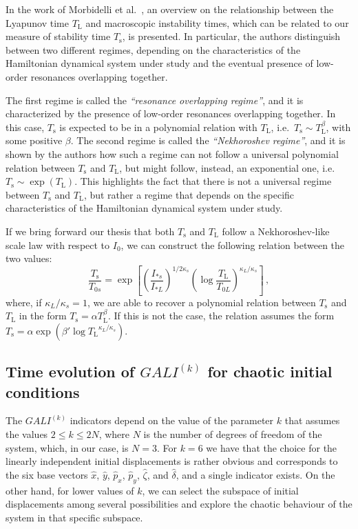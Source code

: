 In the work of Morbidelli et al.~\cite{Morbidelli1995}, an overview on the relationship between the Lyapunov time $T_\mathrm{L}$ and macroscopic instability times, which can be related to our measure of stability time $T_\mathrm{s}$, is presented. In particular, the authors distinguish between two different regimes, depending on the characteristics of the Hamiltonian dynamical system under study and the eventual presence of low-order resonances overlapping together.

The first regime is called the \textit{``resonance overlapping regime''}, and it is characterized by the presence of low-order resonances overlapping together. In this case, $T_\mathrm{s}$ is expected to be in a polynomial relation with $T_\mathrm{L}$, i.e.\ $T_\mathrm{s} \sim T_\mathrm{L}^\beta$, with some positive $\beta$. The second regime is called the \textit{``Nekhoroshev regime''}, and it is shown by the authors how such a regime can not follow a universal polynomial relation between $T_\mathrm{s}$ and $T_\mathrm{L}$, but might follow, instead, an exponential one, i.e.\ $T_\mathrm{s} \sim \exp(T_\mathrm{L})$. This highlights the fact that there is not a universal regime between $T_\mathrm{s}$ and $T_\mathrm{L}$, but rather a regime that depends on the specific characteristics of the Hamiltonian dynamical system under study.

If we bring forward our thesis that both $T_\mathrm{s}$ and $T_\mathrm{L}$ follow a Nekhoroshev-like scale law with respect to $I_0$, we can construct the following relation between the two values:
\begin{equation}
    \frac{T_\mathrm{s}}{T_{0s}} = \exp\left[\left(\frac{I_{\ast s}}{I_{\ast L}}\right)^{1/2\kappa_s}\left(\log\frac{T_\mathrm{L}}{T_{0L}}\right)^{\kappa_L / \kappa_s}\right] \, ,
\end{equation}
where, if $\kappa_L/\kappa_s = 1$, we are able to recover a polynomial relation between $T_\mathrm{s}$ and $T_\mathrm{L}$ in the form $T_\mathrm{s} = \alpha T_\mathrm{L}^\beta$. If this is not the case, the relation assumes the form $T_\mathrm{s} = \alpha \exp(\beta' \log{T_\mathrm{L}}^{\kappa_L / \kappa_s})$.

\subsection{Time evolution of $GALI^{(k)}$ for chaotic initial conditions}

The $GALI^{(k)}$ indicators depend on the value of the parameter $k$ that assumes the values $2 \leq k \leq 2N$, where $N$ is the number of degrees of freedom of the system, which, in our case, is $N=3$. For $k=6$ we have that the choice for the linearly independent initial displacements is rather obvious and corresponds to the six base vectors $\hat{x}$, $\hat{y}$, $\hat{p}_x$, $\hat{p}_y$, $\hat{\zeta}$, and $\hat{\delta}$, and a single indicator exists. On the other hand, for lower values of $k$, we can select the subspace of initial displacements among several possibilities and explore the chaotic behaviour of the system in that specific subspace.

